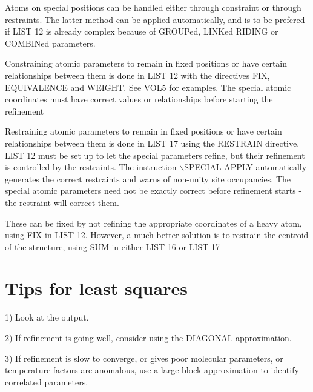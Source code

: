 \documentclass[10pt,a4paper]{report}
\begin{document}
Atoms on special positions can be handled either through constraint 
 or through restraints. The latter method can be applied automatically, and
 is to be prefered if LIST 12 is already complex because of GROUPed, LINKed
 RIDING or COMBINed parameters.


\bigskip{}




Constraining atomic parameters to remain in fixed positions or have 
 certain relationships between them is done in LIST 12 with the directives
 FIX, EQUIVALENCE and WEIGHT. See VOL5 for examples. The special
 atomic coordinates
 must have correct values or relationships before starting the refinement


\bigskip{}




Restraining atomic parameters to remain in fixed positions or have 
 certain relationships between them is done in LIST 17 using the RESTRAIN
 directive. LIST 12 must be set up to let the special parameters refine, 
 but their refinement is controlled by the restraints. The instruction
 $\backslash$SPECIAL APPLY automatically generates the correct restraints and warns of
 non-unity site occupancies. The special atomic parameters need not be
 exactly correct before refinement starts - the restraint will correct them.


 


\bigskip{}




These can be fixed by not refining the appropriate coordinates of a heavy
 atom, using FIX in LIST 12. However, a much better solution is to restrain
 the centroid of the structure, using SUM in either LIST 16 or LIST 17



\section{Tips for least squares}



 1) Look at the output.



 2) If refinement is going well, consider using the DIAGONAL approximation.



 3) If refinement is slow to converge, or gives poor molecular parameters,
   or temperature factors are anomalous, use a large block approximation to 
   identify correlated parameters.
\end{document}
